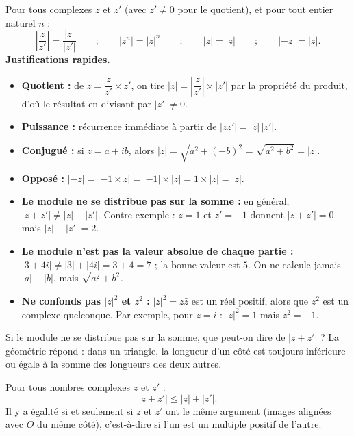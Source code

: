 \documentclass[11pt]{article}
\newcounter{popsec}
\newcounter{popsub}
\newcommand{\courssub}[1]{%
  \stepcounter{popsub}%
  \par\vspace{9pt}\noindent{\popxbold\fontsize{11.5}{13}\selectfont\color{popink}{\color{poporange}\thepopsec.\thepopsub}\hspace{6pt}#1}\par\nopagebreak\vspace{4pt}
}
\begin{document}
\begin{propriete}
Pour tous complexes $z$ et $z'$ (avec $z' \neq 0$ pour le quotient), et pour tout entier naturel $n$ :
\[ \left|\frac{z}{z'}\right| = \frac{|z|}{|z'|} \qquad ; \qquad |z^n| = |z|^n \qquad ; \qquad |\bar{z}| = |z| \qquad ; \qquad |-z| = |z|. \]
\textbf{Justifications rapides.}
\begin{itemize}
\item \textbf{Quotient :} de $z = \dfrac{z}{z'} \times z'$, on tire $|z| = \left|\dfrac{z}{z'}\right| \times |z'|$ par la propriété du produit, d'où le résultat en divisant par $|z'| \neq 0$.
\item \textbf{Puissance :} récurrence immédiate à partir de $|zz'| = |z|\,|z'|$.
\item \textbf{Conjugué :} si $z = a + ib$, alors $|\bar{z}| = \sqrt{a^2 + (-b)^2} = \sqrt{a^2+b^2} = |z|$.
\item \textbf{Opposé :} $|-z| = |-1 \times z| = |-1| \times |z| = 1 \times |z| = |z|$.
\end{itemize}
\end{propriete}

\begin{attention}
\begin{itemize}
\item \textbf{Le module ne se distribue pas sur la somme :} en général, $|z + z'| \neq |z| + |z'|$. Contre-exemple : $z = 1$ et $z' = -1$ donnent $|z + z'| = 0$ mais $|z| + |z'| = 2$.
\item \textbf{Le module n'est pas la valeur absolue de chaque partie :} $|3 + 4i| \neq |3| + |4i| = 3 + 4 = 7$ ; la bonne valeur est $5$. On ne calcule jamais $|a| + |b|$, mais $\sqrt{a^2 + b^2}$.
\item \textbf{Ne confonds pas $|z|^2$ et $z^2$ :} $|z|^2 = z\bar{z}$ est un réel positif, alors que $z^2$ est un complexe quelconque. Par exemple, pour $z = i$ : $|z|^2 = 1$ mais $z^2 = -1$.
\end{itemize}
\end{attention}

\courssub{L'inégalité triangulaire}

Si le module ne se distribue pas sur la somme, que peut-on dire de $|z + z'|$ ? La géométrie répond : dans un triangle, la longueur d'un côté est toujours inférieure ou égale à la somme des longueurs des deux autres.

\begin{propriete}
Pour tous nombres complexes $z$ et $z'$ :
\[ |z + z'| \leq |z| + |z'|. \]
Il y a égalité si et seulement si $z$ et $z'$ ont le même argument (images alignées avec $O$ du même côté), c'est-à-dire si l'un est un multiple positif de l'autre.
\end{propriete}
\end{document}
